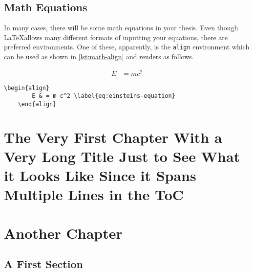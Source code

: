 \section{Math Equations}\label{sec:math-equations}

In many cases, there will be some math equations in your thesis.
Even though \LaTeX allows many different formats of inputting your equations, there are preferred environments.
One of these, apparently, is the \lstinline|align| environment which can be used as shown in \cref{lst:math-align} and renders as follows.

\begin{align}
    E & = m c^2 \label{eq:einsteins-equation}
\end{align}

\begin{lstlisting}[float,language={[LaTeX]TeX}, caption={Sample code for proper typesetting of math equations.},label={lst:math-align}]
    \begin{align}
        E & = m c^2 \label{eq:einsteins-equation}
    \end{align}
\end{lstlisting}



















\chapter[The Short Title of the Chapter Showing Up in the TOC and the Page Headers]{The Very First Chapter With a Very Long Title Just to See What it Looks Like Since it Spans Multiple Lines in the ToC}


\lipsum[1-13]

\chapter{Another Chapter}

\lipsum[14-27]

\section{A First Section}

\lipsum[1-3]

